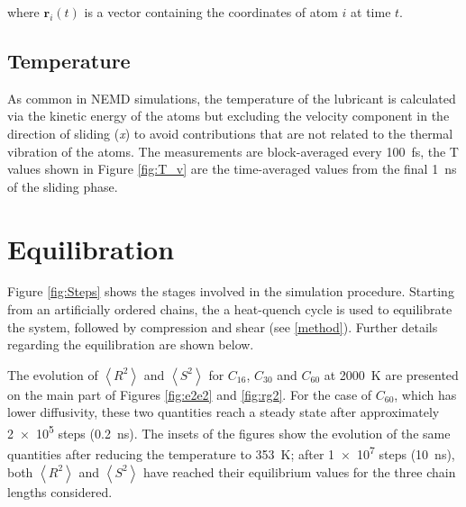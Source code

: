 \documentclass[5p]{elsarticle}
\begin{document}
where   $\mathbf{r}_i\left(t\right)$ is a vector containing the coordinates of atom $i$ at time $t$.


\subsection{Temperature}

As common in NEMD simulations, the temperature of the lubricant is calculated via the kinetic energy of the atoms but excluding the velocity component in the direction of sliding (\emph{x}) to avoid contributions that are not related to the thermal vibration of the atoms. The measurements are block-averaged every \SI{100}{\femto\second}, the T values shown in Figure \ref{fig:T_v} are the time-averaged values from the final \SI{1}{\nano\second} of the sliding phase.

\section{Equilibration}

Figure \ref{fig:Steps} shows the stages involved in the simulation procedure. Starting from an artificially ordered chains, the a heat-quench cycle is used to equilibrate the system, followed by compression and shear (see \ref{method}). Further details regarding the equilibration are shown below.

The evolution of $\left< R^2 \right>$ and $\left< S^2 \right>$ for $C_{16}$, $C_{30}$ and $C_{60}$ at \SI{2000}{\kelvin} are presented on the main part of Figures \ref{fig:e2e2} and \ref{fig:rg2}. For the case of $C_{60}$, which has lower diffusivity, these two quantities reach a steady state after approximately \SI{2e5}{} steps (\SI{0.2}{\nano\second}). The insets of the figures show the evolution of the same quantities after reducing the temperature to \SI{353}{\kelvin}; after \SI{1e7}{} steps (\SI{10}{\nano\second}), both $\left< R^2 \right>$ and $\left< S^2 \right>$ have reached their equilibrium values for the three chain lengths considered.
\end{document}
